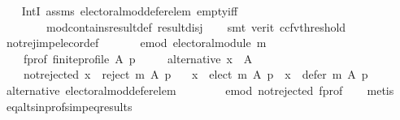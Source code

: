 \begin{isabellebody}
%
\isadelimproof
\ \ %
\endisadelimproof
%
\isatagproof
{}\isamarkupfalse%
\ IntI\ assms\ electoral{\isacharunderscore}{\kern0pt}mod{\isacharunderscore}{\kern0pt}defer{\isacharunderscore}{\kern0pt}elem\ empty{\isacharunderscore}{\kern0pt}iff\isanewline
\ \ \ \ \ \ \ \ mod{\isacharunderscore}{\kern0pt}contains{\isacharunderscore}{\kern0pt}result{\isacharunderscore}{\kern0pt}def\ result{\isacharunderscore}{\kern0pt}disj\isanewline
\ \ \isamarkupfalse%
\ {\isacharparenleft}{\kern0pt}smt\ {\isacharparenleft}{\kern0pt}verit{\isacharcomma}{\kern0pt}\ ccfv{\isacharunderscore}{\kern0pt}threshold{\isacharparenright}{\kern0pt}{\isacharparenright}{\kern0pt}%
\endisatagproof
{\isafoldproof}%
%
\isadelimproof
\isanewline
%
\endisadelimproof
\isanewline
{}\isamarkupfalse%
\ not{\isacharunderscore}{\kern0pt}rej{\isacharunderscore}{\kern0pt}imp{\isacharunderscore}{\kern0pt}elec{\isacharunderscore}{\kern0pt}or{\isacharunderscore}{\kern0pt}def{\isacharcolon}{\kern0pt}\isanewline
\ \ \isanewline
\ \ \ \ e{\isacharunderscore}{\kern0pt}mod{\isacharcolon}{\kern0pt}\ {\isachardoublequoteopen}electoral{\isacharunderscore}{\kern0pt}module\ m{\isachardoublequoteclose}\ \isanewline
\ \ \ \ f{\isacharunderscore}{\kern0pt}prof{\isacharcolon}{\kern0pt}\ {\isachardoublequoteopen}finite{\isacharunderscore}{\kern0pt}profile\ A\ p{\isachardoublequoteclose}\ \isanewline
\ \ \ \ alternative{\isacharcolon}{\kern0pt}\ {\isachardoublequoteopen}x\ {\isasymin}\ A{\isachardoublequoteclose}\ \isanewline
\ \ \ \ not{\isacharunderscore}{\kern0pt}rejected{\isacharcolon}{\kern0pt}\ {\isachardoublequoteopen}x\ {\isasymnotin}\ reject\ m\ A\ p{\isachardoublequoteclose}\isanewline
\ \ \ {\isachardoublequoteopen}x\ {\isasymin}\ elect\ m\ A\ p\ {\isasymor}\ x\ {\isasymin}\ defer\ m\ A\ p{\isachardoublequoteclose}\isanewline
%
\isadelimproof
\ \ %
\endisadelimproof
%
\isatagproof
{}\isamarkupfalse%
\ alternative\ electoral{\isacharunderscore}{\kern0pt}mod{\isacharunderscore}{\kern0pt}defer{\isacharunderscore}{\kern0pt}elem\isanewline
\ \ \ \ \ \ \ \ e{\isacharunderscore}{\kern0pt}mod\ not{\isacharunderscore}{\kern0pt}rejected\ f{\isacharunderscore}{\kern0pt}prof\isanewline
\ \ \isamarkupfalse%
\ metis%
\endisatagproof
{\isafoldproof}%
%
\isadelimproof
\isanewline
%
\endisadelimproof
\isanewline
{}\isamarkupfalse%
\ eq{\isacharunderscore}{\kern0pt}alts{\isacharunderscore}{\kern0pt}in{\isacharunderscore}{\kern0pt}profs{\isacharunderscore}{\kern0pt}imp{\isacharunderscore}{\kern0pt}eq{\isacharunderscore}{\kern0pt}results{\isacharcolon}{\kern0pt}\isanewline

\end{isabellebody}
